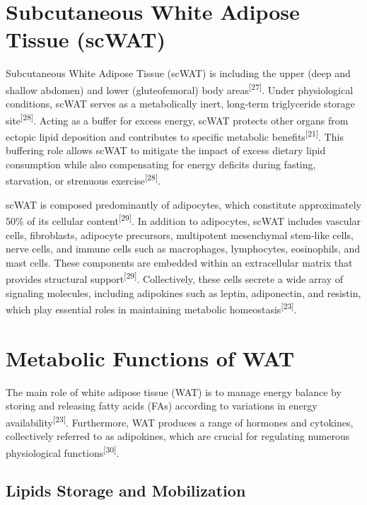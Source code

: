 \documentclass[
  11pt,
  letterpaper,
]{book}
\begin{document}
\section{Subcutaneous White Adipose Tissue
(scWAT)}\label{subcutaneous-white-adipose-tissue-scwat}

Subcutaneous White Adipose Tissue (scWAT) is including the upper (deep
and shallow abdomen) and lower (gluteofemoral) body
areas\textsuperscript{{[}27{]}}. Under physiological conditions, scWAT
serves as a metabolically inert, long-term triglyceride storage
site\textsuperscript{{[}28{]}}. Acting as a buffer for excess energy,
scWAT protects other organs from ectopic lipid deposition and
contributes to specific metabolic benefits\textsuperscript{{[}21{]}}.
This buffering role allows scWAT to mitigate the impact of excess
dietary lipid consumption while also compensating for energy deficits
during fasting, starvation, or strenuous
exercise\textsuperscript{{[}28{]}}.

scWAT is composed predominantly of adipocytes, which constitute
approximately 50\% of its cellular content\textsuperscript{{[}29{]}}. In
addition to adipocytes, scWAT includes vascular cells, fibroblasts,
adipocyte precursors, multipotent mesenchymal stem-like cells, nerve
cells, and immune cells such as macrophages, lymphocytes, eosinophils,
and mast cells. These components are embedded within an extracellular
matrix that provides structural support\textsuperscript{{[}29{]}}.
Collectively, these cells secrete a wide array of signaling molecules,
including adipokines such as leptin, adiponectin, and resistin, which
play essential roles in maintaining metabolic
homeostasis\textsuperscript{{[}23{]}}.

\section{Metabolic Functions of WAT}\label{metabolic-functions-of-wat}

The main role of white adipose tissue (WAT) is to manage energy balance
by storing and releasing fatty acids (FAs) according to variations in
energy availability\textsuperscript{{[}23{]}}. Furthermore, WAT produces
a range of hormones and cytokines, collectively referred to as
adipokines, which are crucial for regulating numerous physiological
functions\textsuperscript{{[}30{]}}.

\subsection{Lipids Storage and
Mobilization}\label{lipids-storage-and-mobilization}
\end{document}
